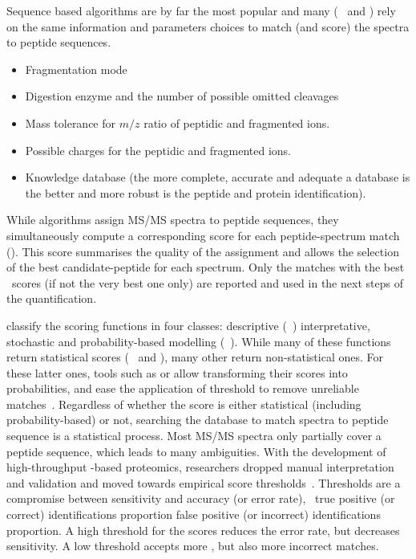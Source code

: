 Sequence based algorithms are by far the most popular
and many (\eg\  and ) rely on
the same information and parameters choices to match
(and score) the spectra to peptide sequences.\mybr\
\begin{itemize}[topsep=0pt,nosep]
    \item Fragmentation mode
    \item Digestion enzyme and the number of possible omitted cleavages
    \item Mass tolerance for $m/z$ ratio of peptidic and fragmented ions.
    \item Possible charges for the peptidic and fragmented ions.
    \item Knowledge database (the more complete, accurate and adequate a database is
       the better and more robust is the peptide and protein identification).
\end{itemize}


While algorithms assign \gls{MS/MS} spectra to peptide sequences,
they simultaneously compute a corresponding score
for each peptide-spectrum match (\psm).
This score summarises the quality of the assignment
and allows the selection of the best candidate-peptide for each spectrum.
Only the matches with the best \psm\ scores (if not the very best one only)
are reported and used in the next steps of the quantification.\mybr\

\citet{Sadygov2004-nl} classify the scoring functions in four classes:
descriptive (\eg\ )
interpretative, stochastic and probability-based modelling (\eg\ ).
While many of these functions return statistical scores
(\eg\ \soft{Mascot} and ),
many other return non-statistical ones.
For these latter ones,
tools such as 
or 
allow transforming their scores into probabilities,
and ease the application of threshold to remove unreliable matches~.
Regardless of whether the score is either statistical (including probability-based) or not,
searching the database to match spectra to peptide sequence is a statistical process.
Most \gls{MS/MS} spectra only partially cover a peptide sequence,
which leads to many ambiguities.
With the development of high-throughput \ms-based proteomics,
researchers dropped manual interpretation and validation
and moved towards empirical score thresholds~.
Thresholds are a compromise between sensitivity and accuracy (or error rate),
\ie\ true positive (or correct) identifications proportion
 false positive (or incorrect) identifications proportion.
A high threshold for the scores reduces the error rate, but decreases sensitivity.
A low threshold accepts more \psms, but also more incorrect matches.\mybr\

